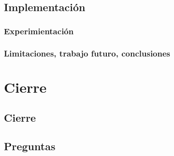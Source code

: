 \documentclass{beamer}
\begin{document}
\subsection{Implementación}
\subsubsection*{Experimientación}
\subsubsection*{Limitaciones, trabajo futuro, conclusiones}
\section{Cierre}
  \subsection*{Cierre}
  \subsection*{Preguntas}

\end{document}
